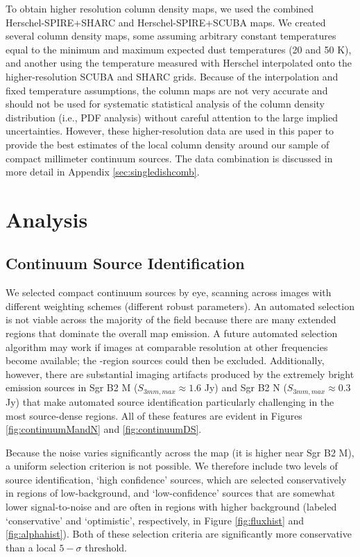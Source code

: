 \documentclass[twocolumn]{aastex61}
\begin{document}
To obtain higher resolution column density maps, we used the combined
Herschel-SPIRE+SHARC and Herschel-SPIRE+SCUBA maps.
We created several column density maps, some assuming arbitrary constant
temperatures equal to the minimum and maximum expected dust temperatures (20
and 50 K), and another using the temperature measured with Herschel
interpolated onto the higher-resolution SCUBA and SHARC grids.  Because of the
interpolation and fixed temperature assumptions, the column maps are not very
accurate and should not be used for systematic statistical analysis of the
column density distribution (i.e., PDF analysis) without careful attention to
the large implied
uncertainties.  However, these higher-resolution data are used in this paper
to provide the best estimates of the local column density around our sample
of compact millimeter continuum sources.
The data combination is discussed in more detail in Appendix
\ref{sec:singledishcomb}.

\section{Analysis}

\subsection{Continuum Source Identification}
\label{sec:contsources}
We selected compact continuum  sources by eye,
scanning across images with different weighting schemes (different robust
parameters).  An automated selection is not viable across the majority of the
field because there are many extended \hii regions that dominate the overall
map emission.  A future automated selection algorithm may work if images at
comparable resolution at other frequencies become available; the \hii-region
sources could then be excluded.  Additionally, however, there are substantial
imaging artifacts produced by the extremely bright emission sources in Sgr B2 M
($S_{3 mm,max} \approx 1.6$ Jy) and Sgr B2 N ($S_{3 mm,max} \approx 0.3$ Jy)
that make automated source identification particularly challenging in the most
source-dense regions.  All of these features are evident in Figures
\ref{fig:continuumMandN} and \ref{fig:continuumDS}.

Because the noise varies significantly across the map (it is higher near Sgr B2
M), a uniform selection criterion is not possible.  We therefore include two
levels of source identification, `high confidence' sources, which are selected
conservatively in regions of low-background, and `low-confidence' sources that
are somewhat lower signal-to-noise and are often in regions with higher
background (labeled `conservative' and `optimistic', respectively, in Figure
\ref{fig:fluxhist} and \ref{fig:alphahist}).  Both of these selection criteria
are significantly more conservative than a local $5-\sigma$ threshold.
\end{document}
